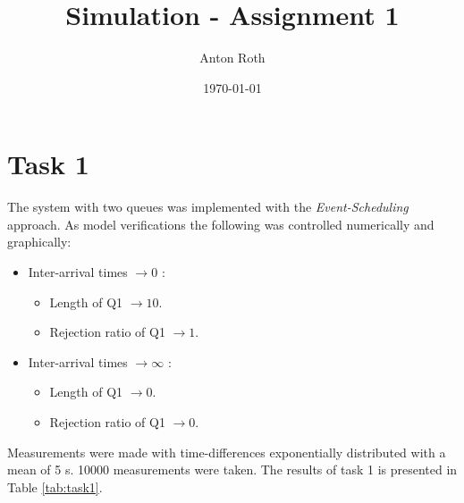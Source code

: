 \documentclass[]{article}
\title{Simulation - Assignment 1}
\author{Anton Roth}
\date{\today}
\begin{document}
\begin{titlepage}
  \maketitle
  \thispagestyle{empty}
\end{titlepage}

\section{Task 1}
The system with two queues was implemented with the {\it Event-Scheduling} approach. As model verifications the following was controlled numerically and graphically:
\begin{itemize}
  \item Inter-arrival times $\rightarrow 0$ :
    \begin{itemize}
      \item Length of Q1 $\rightarrow 10$.
      \item Rejection ratio of Q1 $\rightarrow 1$.
    \end{itemize}
  \item Inter-arrival times $\rightarrow \infty$ :
    \begin{itemize}
      \item Length of Q1 $\rightarrow 0$.
      \item Rejection ratio of Q1 $\rightarrow 0$.
    \end{itemize}
\end{itemize}

Measurements were made with time-differences exponentially distributed with a mean of 5 s. 10000 measurements were taken. The results of task 1 is presented in Table \ref{tab:task1}.

\begin{table}[H]
  \centering
  \caption{My caption}
  \label{tab:task1}
\end{table}
\end{document}
